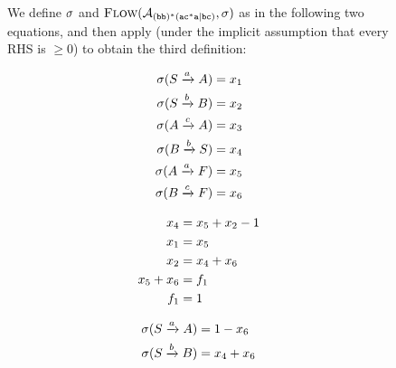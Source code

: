 \documentclass[acmsmall,review,anonymous,screen]{acmart}\settopmatter{printfolios=true,printccs=true,printacmref=true}
\theoremstyle{definition}
\begin{document}
\begin{figure}[ht]
  We define $\operatorname{\sigma}$ and $\textsc{Flow}(\mathcal{A}_{\mathtt{(bb)^\ast(ac^\ast{}a|bc)}}{}, \operatorname{\sigma})$ as in the following two
  equations, and then apply \EquationReasoning{} (under the implicit assumption
  that every RHS is $\geq 0$) to obtain the third definition:
  \begin{minipage}[b]{0.3\linewidth}
    \begin{equation*}
      \begin{aligned}
        \operatorname{\sigma}(S \xrightarrow{a} A) & = x_1 \\
        \operatorname{\sigma}(S \xrightarrow{b} B) & = x_2 \\
        \operatorname{\sigma}(A \xrightarrow{c} A) & = x_3  \\
        \operatorname{\sigma}(B \xrightarrow{b} S) & = x_4 \\
        \operatorname{\sigma}(A \xrightarrow{a} F) & = x_5 \\
        \operatorname{\sigma}(B \xrightarrow{c} F) & = x_6 \\
      \end{aligned}
    \end{equation*}    
  \end{minipage}
  \hspace{0.5cm}
  \begin{minipage}[b]{0.3\linewidth}
    \begin{equation*}
      \begin{aligned}
        x_4 &= x_5 + x_2 - 1 \\
        x_1 &= x_5 \\
        x_2 &= x_4 + x_6 \\
        x_5 + x_6 &= f_1 \\
        f_1 &= 1 \\
      \end{aligned}  
    \end{equation*}    
  \end{minipage}
  \begin{minipage}[b]{0.3\linewidth}
    \begin{equation*}
      \begin{aligned}
        \Filter(\FromLabelTo{S}{a}{A}) & = 1 - \TransitionVar_6 \\
        \Filter(\FromLabelTo{S}{b}{B}) & = \TransitionVar_4 + \TransitionVar_6 \\

\end{aligned}
\end{equation*}
\end{minipage}
\end{figure}
\end{document}

